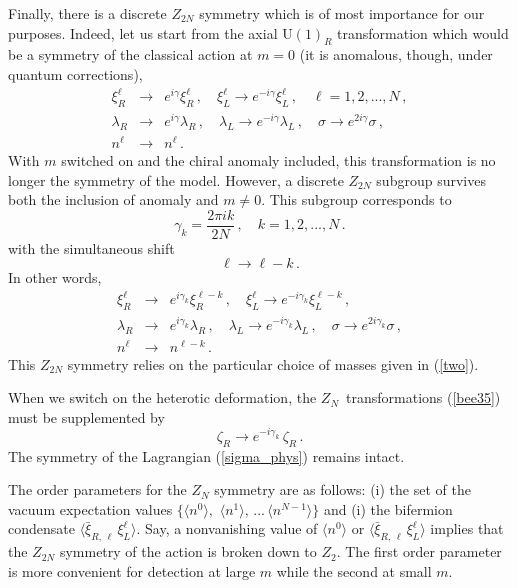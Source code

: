\documentclass[epsfig,12pt]{article}
\def\beq{\begin{equation}}
\def\eeq{\end{equation}}
\def\beqn{\begin{eqnarray}}
\def\eeqn{\end{eqnarray}}
\newcommand{\zn}{$Z_N$}
\def\beqn{\begin{eqnarray}}
\def\eeqn{\end{eqnarray}}
\def\beq{\begin{equation}}
\def\eeq{\end{equation}}
\begin{document}
{Finally, there is a discrete $Z_{2N}$ symmetry which is of most importance for our purposes.
Indeed, let us start from the axial U$(1)_R$ transformation which would be a symmetry
of the classical action at $m=0$ 
 (it is anomalous, though, under quantum corrections),
\beqn
\xi^\ell_R 
&\to& 
e^{i\gamma}\xi^\ell_R\,, \quad
 \xi^\ell_L \to e^{-i\gamma }\xi^\ell_L\,,\quad \ell=1,2, ..., N\,,
 \nonumber\\[2mm]
 \lambda_R 
&\to&
 e^{i\gamma}\lambda_R\,,\quad 
 \lambda_L \to e^{-i\gamma}\lambda_L\,,\quad \sigma \to e^{2i\gamma}\sigma\,,
\nonumber\\[2mm]
n^\ell
&\to&
 n^\ell\,.
 \label{appe11}
\eeqn
With $m$ switched on and the chiral anomaly included, this transformation 
is no longer the symmetry of the model. However, a discrete $Z_{2N}$ subgroup survives both the inclusion of anomaly and $m\neq 0$. This subgroup corresponds to
\beq
\gamma_k =\frac{2\pi i k}{2N}\,,\quad k= 1,2, ..., N\,.
\label{appe12}
\eeq
with the simultaneous shift
\beq
\ell\to \ell - k\,.
\label{appe13}
\eeq
In other words,
\beqn
\xi^\ell_R 
&\to& 
e^{i\gamma_k}\xi^{\ell-k}_R\,, \quad
 \xi^\ell_L \to e^{-i\gamma_k }\xi^{\ell-k}_L\,, 
 \nonumber\\[2mm]
 \lambda_R 
&\to&
 e^{i\gamma_k}\lambda_R\,,\quad 
 \lambda_L \to e^{-i\gamma_k}\lambda_L\,,\quad \sigma \to e^{2i\gamma_k}\sigma\,,
 \nonumber\\[2mm]
 n^\ell &\to & n^{\ell-k}\,.
 \label{bee35}
\eeqn
This $Z_{2N}$ symmetry  relies on the particular choice of masses 
given in (\ref{two}).

When we switch on the heterotic deformation, the \zn\, transformations (\ref{bee35}) must be supplemented by
\beq
\zeta_R \to  e^{-i\gamma_k }\, \zeta_R\,.
\label{bee35p}
\eeq
The symmetry of the Lagrangian (\ref{sigma_phys}) remains intact.


The order parameters for the $Z_N$ symmetry are as follows:
(i) the set of the vacuum expectation values
$\{ \langle n^0\rangle,\,\, \langle n^1\rangle, \,...\, \langle n^{N-1}\rangle\}$
and (i) the bifermion condensate $\langle  \bar\xi_{R,\,\ell}\,\xi^\ell_L\rangle$.
Say, a nonvanishing value of $\langle n^0\rangle$ or  $\langle  \bar\xi_{R,\,\ell}\,\xi^\ell_L\rangle$ implies that the $Z_{2N}$ symmetry of the action is broken down to
$Z_2$. The first order parameter is more convenient for detection
at large $m$ while the second at small $m$. 

}
\end{document}
